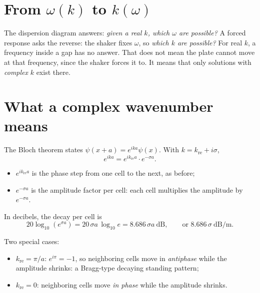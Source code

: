 \section{From $\omega(k)$ to $k(\omega)$}

The dispersion diagram answers: \emph{given a real $k$, which $\omega$ are
possible?} A forced response asks the reverse: the shaker fixes $\omega$, so
\emph{which $k$ are possible?} For real $k$, a frequency inside a gap has no answer.
That does not mean the plate cannot move at that frequency, since the shaker forces
it to. It means that only solutions with \emph{complex} $k$ exist there.

\section{What a complex wavenumber means}

The Bloch theorem states $\psi(x + a) = e^{ika}\psi(x)$. With
$k = k_\mathrm{re} + i\sigma$,
\begin{equation}
  e^{ika} = e^{i k_\mathrm{re} a}\cdot e^{-\sigma a} .
\end{equation}
\begin{itemize}
  \item $e^{i k_\mathrm{re} a}$ is the phase step from one cell to the next, as before;
  \item $e^{-\sigma a}$ is the amplitude factor per cell: each cell multiplies the
        amplitude by $e^{-\sigma a}$.
\end{itemize}
In decibels, the decay per cell is
\begin{equation}
  20\log_{10}\!\left(e^{\sigma a}\right) = 20\,\sigma a\,\log_{10} e = 8.686\,\sigma a
  \ \mathrm{dB}, \qquad \text{or } 8.686\,\sigma \ \mathrm{dB/m} .
\end{equation}

Two special cases:
\begin{itemize}
  \item $k_\mathrm{re} = \pi/a$: $e^{i\pi} = -1$, so neighboring cells move in
        \emph{antiphase} while the amplitude shrinks: a Bragg-type decaying standing
        pattern;
  \item $k_\mathrm{re} = 0$: neighboring cells move \emph{in phase} while the amplitude
        shrinks.
\end{itemize}

